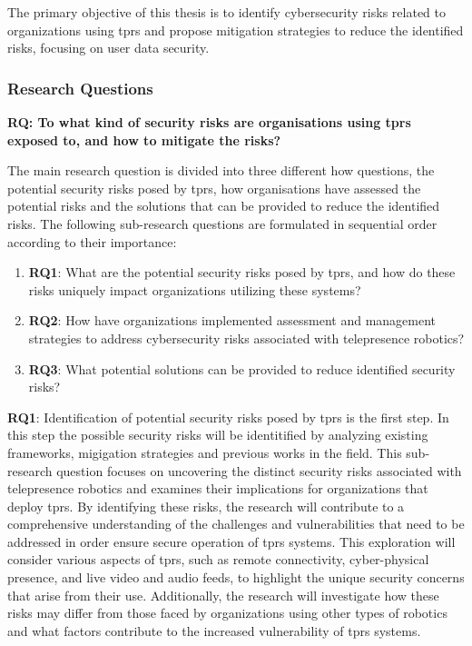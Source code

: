 The primary objective of this thesis is to identify cybersecurity risks related to organizations using \ac{tprs} and propose mitigation strategies to reduce the identified risks, focusing on user data security.

\subsubsection{Research Questions}

\textbf{RQ: To what kind of security risks are organisations using \ac{tprs} exposed to, and how to mitigate the risks?}


The main research question is divided into three different how questions, the potential security risks posed by \ac{tprs}, how organisations
have assessed the potential risks and the solutions that can be provided to reduce the identified risks. The following sub-research
questions are formulated
in sequential order according to their importance:

\begin{enumerate}
  \item\textbf{RQ1}: What are the potential security risks posed by \ac{tprs}, and how do these risks uniquely impact organizations utilizing these systems?
  \item\textbf{RQ2}: How have organizations implemented assessment and management strategies to address cybersecurity risks associated with telepresence robotics?
  \item\textbf{RQ3}: What potential solutions can be provided to reduce identified security risks?
\end{enumerate}

\textbf{RQ1}: Identification of potential security risks posed by \ac{tprs} is the first step. In this step the possible security risks will be identitified by analyzing existing frameworks, migigation strategies and previous works in the field. This sub-research question focuses on uncovering the distinct security risks associated with telepresence robotics and examines their implications for organizations that deploy \ac{tprs}.
  By identifying these risks, the research will contribute to a comprehensive understanding of the challenges and vulnerabilities that need to be addressed in order ensure secure operation of \ac{tprs} systems.
  This exploration will consider various aspects of \ac{tprs}, such as remote connectivity, cyber-physical presence, and live video and audio feeds, to highlight the unique security concerns that arise from their use.
  Additionally, the research will investigate how these risks may differ from those faced by organizations using other types of robotics and what factors contribute to the increased vulnerability of \ac{tprs} systems.

